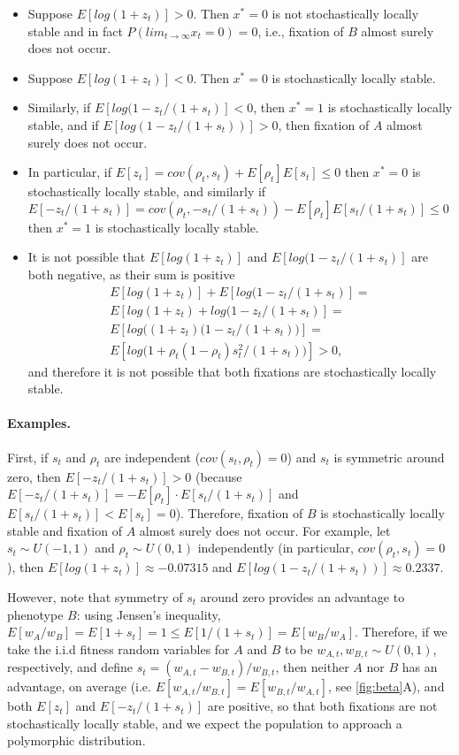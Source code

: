 \documentclass[14pt]{extarticle}
\begin{document}
\begin{itemize}
\item Suppose $E[log(1+z_t)]>0$. Then $x^*=0$ is not stochastically locally stable and in fact $P(lim_{t \to \infty} x_t=0) = 0$, i.e., fixation of $B$ almost surely does not occur.
\item Suppose $E[log(1+z_t)]<0$. Then $x^*=0$ is stochastically locally stable. 
\item Similarly, if $E[log(1-z_t/(1+s_t)]<0$, then $x^*=1$ is stochastically locally stable, and if $E[log(1-z_t/(1+s_t))]>0$, then fixation of $A$ almost surely does not occur.
\item In particular, if $E[z_t] = cov(\rho_t, s_t) + E[\rho_t] E[s_t] \le 0$ then $x^*=0$ is stochastically locally stable, and similarly if $E[-z_t/(1+s_t)] = cov(\rho_t, -s_t/(1+s_t)) - E[\rho_t] E[s_t/(1+s_t)] \le 0$ then $x^*=1$ is stochastically locally stable.
\item It is not possible that $E[log(1+z_t)]$ and $E[log(1-z_t/(1+s_t)]$ are both negative, as their sum is positive
\begin{multline}
E[log(1+z_t)] + E[log(1-z_t/(1+s_t)] = \\
E[log(1+z_t) + log(1-z_t/(1+s_t)]= \\
E[log\big((1+z_t)(1-z_t/(1+s_t)\big)]= \\
E[log\big( 1+\rho_t(1-\rho_t)s_t^2/(1+s_t) \big)] > 0,
\end{multline}
and therefore it is not possible that both fixations are stochastically locally stable.
\end{itemize}

\paragraph{Examples.}
First, if $s_t$ and $\rho_t$ are independent ($cov(s_t, \rho_t)=0$) and $s_t$ is symmetric around zero, then $E[-z_t/(1+s_t)] > 0$ (because $E[-z_t/(1+s_t)] = - E[\rho_t] \cdot E[s_t/(1+s_t)]$ and $E[s_t/(1+s_t)] < E[s_t] = 0$).
Therefore, fixation of $B$ is stochastically locally stable and fixation of $A$ almost surely does not occur.
For example, let $s_t \sim U(-1, 1)$ and $\rho_t \sim U(0,1)$ independently (in particular, $cov(\rho_t, s_t)=0$), then $E[log(1+z_t)]\approx -0.07315$ and $E[log(1-z_t/(1+s_t))]\approx 0.2337$.

However, note that symmetry of $s_t$ around zero provides an advantage to phenotype $B$: using Jensen's inequality, $E[w_A/w_B] = E[1+s_t] = 1 \le E[1/(1+s_t)] = E[w_B/w_A]$.
Therefore, if we take the i.i.d fitness random variables for $A$ and $B$ to be $w_{A,t}, w_{B,t} \sim U(0,1)$, respectively, and define $s_t=(w_{A,t}-w_{B,t})/w_{B,t}$, then neither $A$ nor $B$ has an advantage, on average (i.e. $E[w_{A,t}/w_{B,t}]=E[w_{B,t}/w_{A,t}]$, see \autoref{fig:beta}A), and both $E[z_t]$ and $E[-z_t/(1+s_t)]$ are positive, so that both fixations are not stochastically locally stable, and we expect the population to approach a polymorphic distribution.
\end{document}
